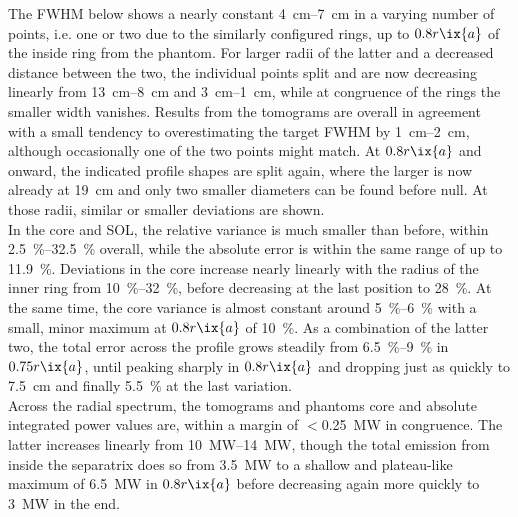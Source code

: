                 The FWHM below shows a nearly constant \SIrange{4}{7}{\centi\meter} in a varying number of points, i.e. one or two due to the similarly configured rings, up to $0.8r\ix{a}$ of the inside ring from the phantom. For larger radii of the latter and a decreased distance between the two, the individual points split and are now decreasing linearly from \SIrange{13}{8}{\centi\meter} and \SIrange{3}{1}{\centi\meter}, while at congruence of the rings the smaller width vanishes. Results from the tomograms are overall in agreement with a small tendency to overestimating the target FWHM by \SIrange{1}{2}{\centi\meter}, although occasionally one of the two points might match. At $0.8r\ix{a}$ and onward, the indicated profile shapes are split again, where the larger is now already at \SI{19}{\centi\meter} and only two smaller diameters can be found before null. At those radii, similar or smaller deviations are shown.\\%
                In the core and SOL, the relative variance is much smaller than before, within \SIrange{2.5}{32.5}{\percent} overall, while the absolute error is within the same range of up to \SI{11.9}{\percent}. Deviations in the core increase nearly linearly with the radius of the inner ring from \SIrange{10}{32}{\percent}, before decreasing at the last position to \SI{28}{\percent}. At the same time, the core variance is almost constant around \SIrange{5}{6}{\percent} with a small, minor maximum at $0.8r\ix{a}$ of \SI{10}{\percent}. As a combination of the latter two, the total error across the profile grows steadily from \SIrange{6.5}{9}{\percent} in $0.75r\ix{a}$, until peaking sharply in $0.8r\ix{a}$ and dropping just as quickly to \SI{7.5}{\centi\meter} and finally \SI{5.5}{\percent} at the last variation.\\%
                Across the radial spectrum, the tomograms and phantoms core and absolute integrated power values are, within a margin of $<$\SI{0.25}{\mega\watt} in congruence. The latter increases linearly from \SIrange{10}{14}{\mega\watt}, though the total emission from inside the separatrix does so from \SI{3.5}{\mega\watt} to a shallow and plateau-like maximum of \SI{6.5}{\mega\watt} in $0.8r\ix{a}$ before decreasing again more quickly to \SI{3}{\mega\watt} in the end.\\%
